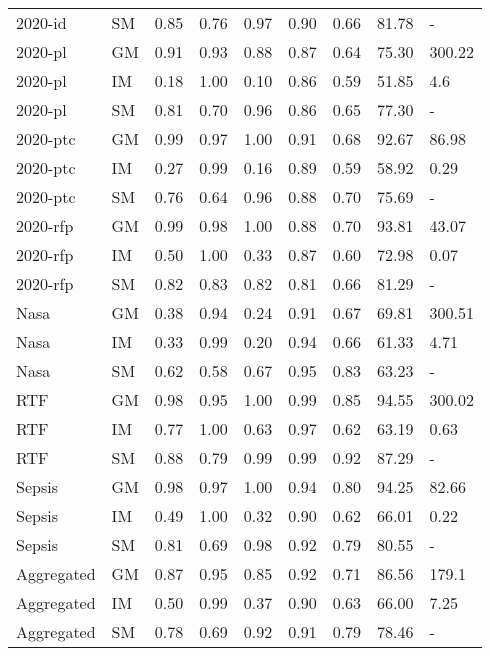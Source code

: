 \begin{tabular}{llrrrrrrl}
2020-id & SM & 0.85 & 0.76 & 0.97 & 0.90 & 0.66 & 81.78 & - \\
2020-pl & GM & 0.91 & 0.93 & 0.88 & 0.87 & 0.64 & 75.30 & 300.22 \\
2020-pl & IM & 0.18 & 1.00 & 0.10 & 0.86 & 0.59 & 51.85 & 4.6 \\
2020-pl & SM & 0.81 & 0.70 & 0.96 & 0.86 & 0.65 & 77.30 & - \\
2020-ptc & GM & 0.99 & 0.97 & 1.00 & 0.91 & 0.68 & 92.67 & 86.98 \\
2020-ptc & IM & 0.27 & 0.99 & 0.16 & 0.89 & 0.59 & 58.92 & 0.29 \\
2020-ptc & SM & 0.76 & 0.64 & 0.96 & 0.88 & 0.70 & 75.69 & - \\
2020-rfp & GM & 0.99 & 0.98 & 1.00 & 0.88 & 0.70 & 93.81 & 43.07 \\
2020-rfp & IM & 0.50 & 1.00 & 0.33 & 0.87 & 0.60 & 72.98 & 0.07 \\
2020-rfp & SM & 0.82 & 0.83 & 0.82 & 0.81 & 0.66 & 81.29 & - \\
Nasa & GM & 0.38 & 0.94 & 0.24 & 0.91 & 0.67 & 69.81 & 300.51 \\
Nasa & IM & 0.33 & 0.99 & 0.20 & 0.94 & 0.66 & 61.33 & 4.71 \\
Nasa & SM & 0.62 & 0.58 & 0.67 & 0.95 & 0.83 & 63.23 & - \\
RTF & GM & 0.98 & 0.95 & 1.00 & 0.99 & 0.85 & 94.55 & 300.02 \\
RTF & IM & 0.77 & 1.00 & 0.63 & 0.97 & 0.62 & 63.19 & 0.63 \\
RTF & SM & 0.88 & 0.79 & 0.99 & 0.99 & 0.92 & 87.29 & - \\
Sepsis & GM & 0.98 & 0.97 & 1.00 & 0.94 & 0.80 & 94.25 & 82.66 \\
Sepsis & IM & 0.49 & 1.00 & 0.32 & 0.90 & 0.62 & 66.01 & 0.22 \\
Sepsis & SM & 0.81 & 0.69 & 0.98 & 0.92 & 0.79 & 80.55 & - \\
Aggregated & GM & 0.87 & 0.95 & 0.85 & 0.92 & 0.71 & 86.56 & 179.1 \\
Aggregated & IM & 0.50 & 0.99 & 0.37 & 0.90 & 0.63 & 66.00 & 7.25 \\
Aggregated & SM & 0.78 & 0.69 & 0.92 & 0.91 & 0.79 & 78.46 & - \\
\bottomrule
\end{tabular}
